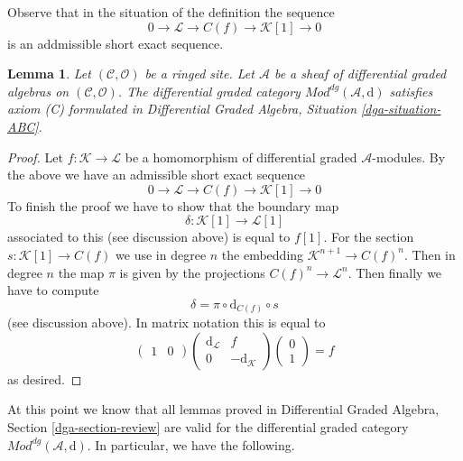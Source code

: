 \documentclass{stacks-project}
\theoremstyle{plain}
\newtheorem{lemma}[subsection]{Lemma}
\theoremstyle{definition}
\theoremstyle{remark}
\numberwithin{equation}{subsection}
\begin{document}
\noindent
Observe that in the situation of the definition the sequence
$$
0 \to \mathcal{L} \to C(f) \to \mathcal{K}[1] \to 0
$$
is an addmissible short exact sequence.

\begin{lemma}
\label{lemma-axiom-C}
Let $(\mathcal{C}, \mathcal{O})$ be a ringed site.
Let $\mathcal{A}$ be a sheaf of differential graded algebras
on $(\mathcal{C}, \mathcal{O})$.
The differential graded category
$\textit{Mod}^{dg}(\mathcal{A}, \text{d})$
satisfies axiom (C) formulated in
Differential Graded Algebra, Situation \ref{dga-situation-ABC}.
\end{lemma}

\begin{proof}
Let $f : \mathcal{K} \to \mathcal{L}$
be a homomorphism of differential graded $\mathcal{A}$-modules.
By the above we have an admissible short exact sequence
$$
0 \to \mathcal{L} \to C(f) \to \mathcal{K}[1] \to 0
$$
To finish the proof we have to show that the boundary map
$$
\delta : \mathcal{K}[1] \to \mathcal{L}[1]
$$
associated to this (see discussion above) is equal to $f[1]$.
For the section $s : \mathcal{K}[1] \to C(f)$ we use in degree
$n$ the embedding $\mathcal{K}^{n + 1} \to C(f)^n$. Then
in degree $n$ the map $\pi$ is given by the projections
$C(f)^n \to \mathcal{L}^n$. Then finally we have to compute
$$
\delta = \pi \circ \text{d}_{C(f)} \circ s
$$
(see discussion above). In matrix notation this is equal to
$$
\left(
\begin{matrix}
1 & 0
\end{matrix}
\right)
\left(
\begin{matrix}
\text{d}_\mathcal{L} & f \\
0 & -\text{d}_\mathcal{K}
\end{matrix}
\right)
\left(
\begin{matrix}
0 \\
1
\end{matrix}
\right) = f
$$
as desired.
\end{proof}

\noindent
At this point we know that all lemmas proved in
Differential Graded Algebra, Section \ref{dga-section-review}
are valid for the differential graded category
$\textit{Mod}^{dg}(\mathcal{A}, \text{d})$.
In particular, we have the following.
\end{document}

